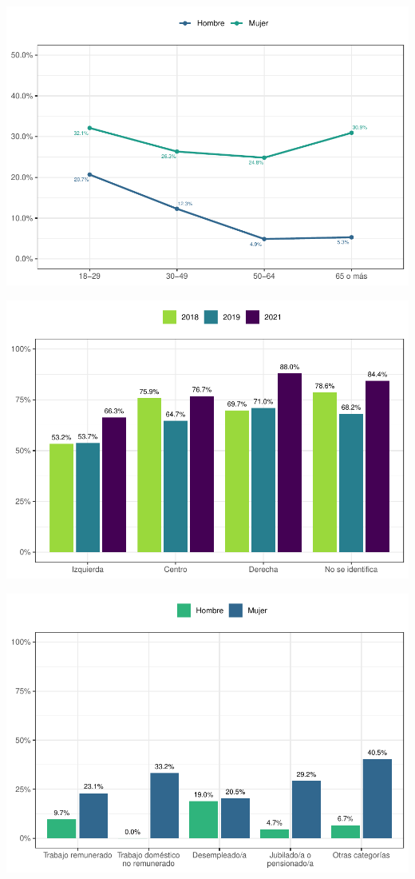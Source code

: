 \documentclass[
  12pt,
]{book}
\begin{document}
\begin{center}\includegraphics{reporte-elsoc_files/figure-latex/depre-edad-sexo-1} \end{center}

\begin{center}\includegraphics{reporte-elsoc_files/figure-latex/unnamed-chunk-22-1} \end{center}

\begin{center}\includegraphics{reporte-elsoc_files/figure-latex/depre-labstat-1} \end{center}
\end{document}
